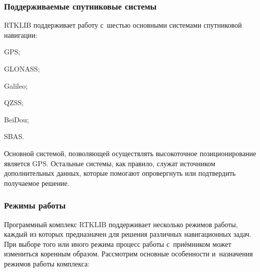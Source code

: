 \subsubsection{Поддерживаемые спутниковые системы}

RTKLIB поддерживает работу с~шестью основными системами спутниковой навигации:

\begin{dashitemize}
  \item GPS;
  \item GLONASS;
  \item Galileo;
  \item QZSS;
  \item BeiDou;
  \item SBAS.
\end{dashitemize}

Основной системой, позволяющей осуществлять высокоточное позиционирование является GPS. Остальные системы, как правило, служат источником дополнительных данных, которые помогают опровергнуть или подтвердить получаемое решение.

\subsubsection{Режимы работы}

Программный комплекс RTKLIB поддерживает несколько режимов работы, каждый из которых предназначен для решения различных навигационных задач. При выборе того или иного режима процесс работы с~приёмником может измениться коренным образом. Рассмотрим основные особенности и~назначения режимов работы комплекса:

